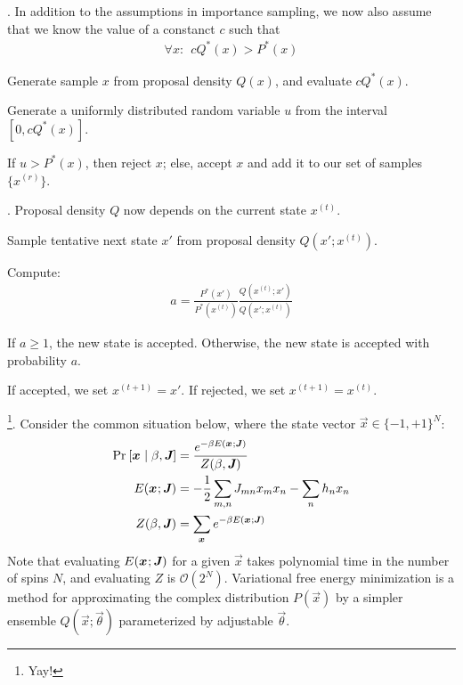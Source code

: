 \documentclass[11pt]{article}
\begin{document}
\myspace
\p {}. In addition to the assumptions in importance sampling, we now also assume that we know the value of a constanct $c$ such that
\begin{align}
	\forall x: ~~	cQ^*(x) > P^*(x)
\end{align}
\begin{compactenum}
	\item Generate sample $x$ from proposal density $Q(x)$, and evaluate $c Q^*(x)$. 
	\item Generate a uniformly distributed random variable $u$ from the interval $[0, cQ^*(x)]$.
	\item If $u > P^*(x)$, then reject $x$; else, accept $x$ and add it to our set of samples $\{x^{(r)}\}$.
\end{compactenum}

\myspace
\p {}. Proposal density $Q$ now depends on the current state $x^{(t)}$.
\begin{compactenum}
	\item Sample tentative next state $x'$ from proposal density $Q(x'; x^{(t)})$.
	\item Compute:
	\begin{align}
		a = 
		\frac{  P^*(x') }{ P^*(x^{(t)}) }  
		\frac{ Q(x^{(t)}; x') }{ Q(x'; x^{(t)}) }
	\end{align}
	\item If $a \ge 1$, the new state is accepted. Otherwise, the new state is accepted with probability $a$. 
	\item If accepted, we set $x^{(t + 1)} = x'$. If rejected, we set $x^{(t+1)} = x^{(t)}$. 
\end{compactenum}



\p {}\footnote{Yay!}. Consider the common situation below, where the state vector $\vec{x} \in \{-1, +1\}^N$: 
\begin{align}
	\text{Pr}_{}\left[\bm{x}_{} \mid \beta, \bm{J}_{}\right]
	&= \dfrac{ e^{-\beta E(\bm{x}_{}; \bm{J}_{})} }{ Z(\beta, \bm{J}_{}) }  \label{spin-prob} \\
	E(\bm{x}_{}; \bm{J}_{}) &= -\frac{1}{2} \sum_{m,n} J_{mn} x_m x_n - \sum_n h_n x_n \label{spin-energy} \\
	Z(\beta, \bm{J}_{}) &= \sum_{\bm{x}_{}} e^{-\beta E(\bm{x}_{}; \bm{J}_{})}
\end{align}
Note that evaluating $E(\bm{x}_{}; \bm{J}_{})$ for a given $\vec{x}$ takes polynomial time in the number of spins $N$, and evaluating $Z$ is $\mathcal{O}(2^N)$. Variational free energy minimization is a method for approximating the complex distribution $P(\vec x)$ by a simpler ensemble $Q(\vec x; \vec{\theta})$ parameterized by adjustable $\vec{\theta}$. 
\end{document}

